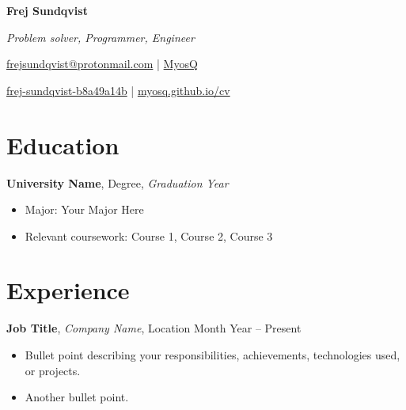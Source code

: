 \documentclass[11pt, a4paper]{article}
\begin{document}
\noindent
\begin{minipage}{0.25\textwidth}
\end{minipage}%
\begin{minipage}{0.75\textwidth}
    \centerline{
        \Large\bfseries Frej Sundqvist
    }
    \vspace{0.2em}
    \centerline{
        \textit{Problem solver, Programmer, Engineer}
    }
    \vspace{0.5em}
    \centerline{
        {\faEnvelopeO} \href{mailto:frejsundqvist@protonmail.com}{frejsundqvist@protonmail.com}
        |
        {\faGithub} \href{https://github.com/MyosQ}{MyosQ}
    }
    \centerline{
        {\faLinkedin} \href{https://www.linkedin.com/in/frej-sundqvist-b8a49a14b}{frej-sundqvist-b8a49a14b}
        |
        {\faGlobe} \href{https://www.myosq.github.io/cv}{myosq.github.io/cv}    
    }
\end{minipage}

\vspace{1em}

\section*{Education}
\textbf{University Name}, Degree, \textit{Graduation Year}
\begin{itemize}[noitemsep]
    \item Major: Your Major Here
    \item Relevant coursework: Course 1, Course 2, Course 3
\end{itemize}

\section*{Experience}
\textbf{Job Title}, \textit{Company Name}, Location \hfill Month Year – Present
\begin{itemize}[noitemsep]
    \item Bullet point describing your responsibilities, achievements, technologies used, or projects.
    \item Another bullet point.
\end{itemize}
\end{document}
